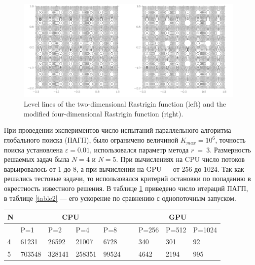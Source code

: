 \documentclass[10pt,a4paper]{book}
\begin{document}
\begin{figure}
\begin{center}
  \includegraphics[width=1.0\linewidth]{./pic/s2.png}
   {Level lines of the two-dimensional Rastrigin function (left) and the modified four-dimensional Rastrigin function (right).}
  \label{fig:s2}  
\end{center}
\end{figure}


При проведении экспериментов число испытаний параллельного алгоритма глобального поиска (ПАГП), было ограничено величиной $K_{max}=10^6$, точность поиска установлена $\varepsilon=0.01$, использовался параметр метода $r\ =\ 3$. Размерность решаемых задач была $N = 4$ и $N = 5$. При вычислениях на CPU число потоков варьировалось от 1 до 8, а при вычислении на GPU --- от 256 до 1024. Так как решались тестовые задачи, то использовался критерий остановки по попаданию в окрестность известного решения. В таблице \ref{table1} приведено число итераций ПАГП, в таблице \ref{table2} --- его ускорение по сравнению с однопоточным запуском.

\begin{table}[!ht]
    \centering
    \label{table1}
    \begin{tabular}{|l|l|l|l|l|l|l|l|l|}
    \hline
        N &\multicolumn{4}{c|}{CPU} & ~ & \multicolumn{3}{c|}{GPU} \\ \hline
        ~ & P=1 & P=2 & P=4 & P=8 &   & P=256 & P=512 & P=1024  \\ \hline
        4 & 61231 & 26592 & 21007 & 6728 &   & 340 & 301 & 92  \\ \hline
        5 & 703548 & 328141 & 258351 & 99524 &   & 4642 & 2194 & 995  \\ \hline
    \end{tabular}
\end{table}
\end{document}
